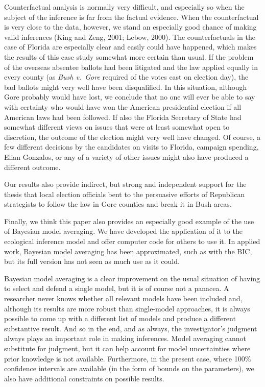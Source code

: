 \documentclass[11pt,titlepage]{article}
\begin{document}
Counterfactual analysis is normally very difficult, and especially so
when the subject of the inference is far from the factual evidence.
When the counterfactual is very close to the data, however, we stand
an especially good chance of making valid inferences (King and Zeng,
2001; Lebow, 2000)\nocite{KinZen01,Lebow00}.  The counterfactuals in
the case of Florida are especially clear and easily could have
happened, which makes the results of this case study somewhat more
certain than usual.  If the problem of the overseas absentee ballots
had been litigated and the law applied equally in every county (as
\emph{Bush v.\ Gore} required of the votes cast on election day), the
bad ballots might very well have been disqualified.  In this
situation, although Gore probably would have lost, we conclude that no
one will ever be able to say with certainty who would have won the
American presidential election if all American laws had been followed.
If also the Florida Secretary of State had somewhat different views on
issues that were at least somewhat open to discretion, the outcome of
the election might very well have changed.  Of course, a few different
decisions by the candidates on visits to Florida, campaign spending,
Elian Gonzalos, or any of a variety of other issues might also have
produced a different outcome.

Our results also provide indirect, but strong and independent support
for the thesis that local election officials bent to the persuasive
efforts of Republican strategists to follow the law in Gore counties
and break it in Bush areas.

Finally, we think this paper also provides an especially good example
of the use of Bayesian model averaging.  We have developed the
application of it to the ecological inference model and offer computer
code for others to use it.  In applied work, Bayesian model averaging
has been approximated, such as with the BIC, but its full version has
not seen as much use as it could.

Bayesian model averaging is a clear improvement on the usual situation
of having to select and defend a single model, but it is of course not
a panacea. A researcher never knows whether all relevant models have
been included and, although its results are more robust than
single-model approaches, it is always possible to come up with a
different list of models and produce a different substantive result.
And so in the end, and as always, the investigator's judgment always
plays an important role in making inferences.  Model averaging cannot
substitute for judgment, but it can help account for model
uncertainties where prior knowledge is not available. Furthermore, in
the present case, where 100\% confidence intervals are available (in
the form of bounds on the parameters), we also have additional
constraints on possible results.
\end{document}
